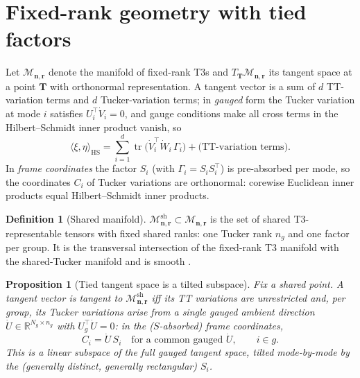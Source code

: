 \documentclass[11pt]{article}
\newtheorem{proposition}[theorem]{Proposition}
\theoremstyle{definition}
\newtheorem{definition}[theorem]{Definition}
\theoremstyle{remark}
\newcommand{\R}{\mathbb{R}}
\newcommand{\T}{\boldsymbol{T}}
\newcommand{\tr}{\operatorname{tr}}
\newcommand{\HS}{\mathrm{HS}}
\newcommand{\Mnr}{\mathcal{M}_{\boldsymbol{n},\boldsymbol{r}}}
\newcommand{\Msh}{\mathcal{M}^{\mathrm{sh}}_{\boldsymbol{n},\boldsymbol{r}}}
\begin{document}
\section{Fixed-rank geometry with tied factors}\label{sec:geometry}

Let $\Mnr$ denote the manifold of fixed-rank T3s and
$T_{\T}\Mnr$ its tangent space at a point $\T$ with orthonormal
representation. A tangent vector is a sum of $d$ TT-variation terms and $d$
Tucker-variation terms; in \emph{gauged} form the Tucker variation at mode
$i$ satisfies $U_i^\top \dot V_i = 0$, and gauge conditions make all cross
terms in the Hilbert--Schmidt inner product vanish, so
\begin{equation}\label{eq:hsnorm}
\langle \xi, \eta \rangle_{\HS}
= \sum_{i=1}^{d} \tr\bigl( \dot V_i^\top \dot W_i\, \Gamma_i \bigr)
+ \text{(TT-variation terms)} .
\end{equation}
In \emph{frame coordinates} the factor $S_i$ (with $\Gamma_i = S_i S_i^\top$)
is pre-absorbed per mode, so the coordinates $C_i$ of Tucker variations are
orthonormal: corewise Euclidean inner products equal Hilbert--Schmidt inner
products.

\begin{definition}[Shared manifold]
$\Msh \subset \Mnr$ is the set of shared T3-representable tensors with fixed
shared ranks: one Tucker rank $n_g$ and one factor per group. It is the
transversal intersection of the fixed-rank T3 manifold with the shared-Tucker
manifold and is smooth \cite[Thm.~5]{MR2026}.
\end{definition}

\begin{proposition}[Tied tangent space is a tilted subspace]\label{prop:tilt}
Fix a shared point. A tangent vector is tangent to $\Msh$ iff its TT
variations are unrestricted and, per group, its Tucker variations arise from
a single \emph{gauged ambient direction} $\dot U \in \R^{N_g \times n_g}$
with $U_g^\top \dot U = 0$: in the ($S$-absorbed) frame coordinates,
\begin{equation}\label{eq:tied}
C_i = \dot U\, S_i \quad \text{for a common gauged } \dot U, \qquad i \in g .
\end{equation}
This is a linear subspace of the full gauged tangent space, tilted
mode-by-mode by the (generally distinct, generally rectangular) $S_i$.
\end{proposition}
\end{document}
